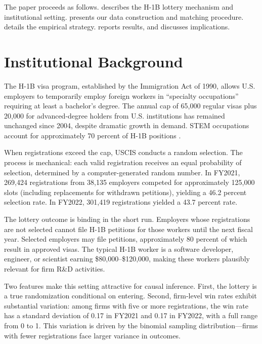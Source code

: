 \documentclass[12pt]{article}
\begin{document}
The paper proceeds as follows.  describes the H-1B lottery mechanism and institutional setting.  presents our data construction and matching procedure.  details the empirical strategy.  reports results, and  discusses implications.

\section{Institutional Background}
\label{sec:background}

The H-1B visa program, established by the Immigration Act of 1990, allows U.S. employers to temporarily employ foreign workers in ``specialty occupations'' requiring at least a bachelor's degree. The annual cap of 65,000 regular visas plus 20,000 for advanced-degree holders from U.S. institutions has remained unchanged since 2004, despite dramatic growth in demand. STEM occupations account for approximately 70 percent of H-1B positions \citep{peri2015}.

When registrations exceed the cap, USCIS conducts a random selection. The process is mechanical: each valid registration receives an equal probability of selection, determined by a computer-generated random number. In FY2021, 269,424 registrations from 38,135 employers competed for approximately 125,000 slots (including replacements for withdrawn petitions), yielding a 46.2 percent selection rate. In FY2022, 301,419 registrations yielded a 43.7 percent rate.

The lottery outcome is binding in the short run. Employers whose registrations are not selected cannot file H-1B petitions for those workers until the next fiscal year. Selected employers may file petitions, approximately 80 percent of which result in approved visas. The typical H-1B worker is a software developer, engineer, or scientist earning \$80,000--\$120,000, making these workers plausibly relevant for firm R\&D activities.

Two features make this setting attractive for causal inference. First, the lottery is a true randomization conditional on entering. Second, firm-level win rates exhibit substantial variation: among firms with five or more registrations, the win rate has a standard deviation of 0.17 in FY2021 and 0.17 in FY2022, with a full range from 0 to 1. This variation is driven by the binomial sampling distribution---firms with fewer registrations face larger variance in outcomes.
\end{document}
